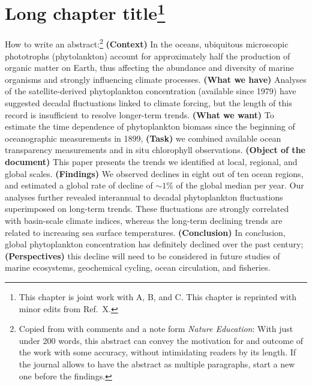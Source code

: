\graphicspath{{Chap1/figures/}}

\setlength{\tabcolsep}{12pt}

\chapter[Short chapter title for header and toc]{Long chapter title\footnote{
This chapter is joint work with A, B, and C. This chapter is reprinted with minor edits from Ref.~X.
}}\label{chap:impact_of_technologies}
\begin{chapterabstract}
    How to write an abstract:\footnote{
		Copied from \cite{boyce2010global} with comments and a note form \textit{Nature Education}:
		With just under 200 words, this abstract can convey the motivation for and outcome of the work with some accuracy, without intimidating readers by its length.
		If the journal allows to have the abstract as multiple paragraphs, start a new one before the findings.
	}
	\textbf{(Context)} In the oceans, ubiquitous microscopic phototrophs (phytolankton) account for approximately half the production of organic matter on Earth, thus affecting the abundance and diversity of marine organisms and strongly influencing
	climate processes.
	\textbf{(What we have)} Analyses of the satellite-derived phytoplankton concentration (available since 1979) have suggested decadal fluctuations linked to climate forcing, but the length of this record is insufficient to resolve longer-term trends.
	\textbf{(What we want)} To estimate the time dependence of phytoplankton biomass since the beginning of oceanographic measurements in 1899, 
	\textbf{(Task)}	we combined available ocean transparency measurements and in situ chlorophyll observations.
	\textbf{(Object of the document)} This paper presents the trends we identified at local, regional, and global scales.
	\textbf{(Findings)} We observed declines in eight out of ten ocean regions, and estimated a global rate of decline of $\sim 1\%$ of the global median
	per year. Our analyses further revealed interannual to decadal phytoplankton fluctuations superimposed on long-term trends.
	These fluctuations are strongly correlated with basin-scale climate indices, whereas the long-term declining trends are	related to increasing sea surface temperatures.
	\textbf{(Conclusion)} In conclusion, global phytoplankton concentration has definitely declined over the past century; 
	\textbf{(Perspectives)} this decline will need to be considered	in future studies of marine ecosystems, geochemical cycling,
	ocean circulation, and fisheries.
\end{chapterabstract}

